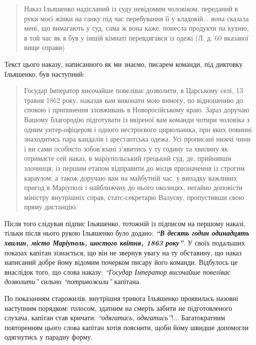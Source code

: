 \documentclass[a4paper,20pt]{report}
\begin{document}
\begin{quote}
\em\bfseries

Наказ Ільяшенко надісланий із суду невідомим чоловіком, переданий в руки моєї
жінки на ганку під час перебування її у кладовій... вона сказала мені, що
вимагають у суд, сама ж вона каже, понесла продукти на кухню, в той час як я
був у іншій кімнаті перевдягався із одежі (Л. д. 60 вказаної вище справи)
	
\end{quote}

Текст цього наказу, написанного як ми знаємо, писарем команди, під диктовку
Ільяшенко, був наступний:

\begin{quote}
\em\bfseries

Государ Імператор височайше повеліває дозволити, в Царському селі, 13 травня 1862
року, наказав вам виконати мою вимогу, по відношенню до спокою і
припинення зловживань в Новоросійському краю. Зараз доручаю Вашому
благородію підготувати із ввіреної вам команди чотири чоловіка з одним
унтер-офіцером і одного нестроєвого цирюльника, при яких повинні знаходитись
пара кандалів і арестантська одежа. Усі прописані нижчі чини і ви сами
особисто зобов'язані з'явитись у ту годину та хвилину як отримаєте сей наказ,
в маріупольський грецький суд, де, прийнявши злочинця, із першим етапом відправити
до місця призначення із строгим караулом, а також доручаю вам на майбутній час, у випадку
важливих пригод в Маріуполі і найближчих до нього околицях, негайно доповісти міністру
внутрішніх справ, статс-секретарю Валуєву, пропустивши свою пряму дистанцію.

\end{quote}

Після того слідував підпис Ільяшенко, тотожній із підписом на першому наказі, тільки після нього
рукою Ільяшенко було додано: \textbf{\em ``В десять годин одинадцять хвилин, місто Маріуполь, шостого квітня, 1863 року''}.
У своїх подальших показах капітан зізнається, що він не звернув увагу на ту обставину, що наказ написаний
добре йому відомим почерком писару його команди. Відбулось це внаслідок того, що слова наказу:
\emph{``Государ Імператор височайше повеліває дозволити''} сильно \emph{``потривожили''} капітана.

По показанням старожилів, внутрішня тривога Ільяшенко проявилась назовні
наступним порядком: голосом, здатним на смерть забити не підготовленого
слухача, капітан став кричати: \emph{``одягатись, одягатись''}!...
Багатократним повторенням цього слова капітан хотів пояснити, щоби йому швидше
допомогли одягнутись у парадну форму.
\end{document}
